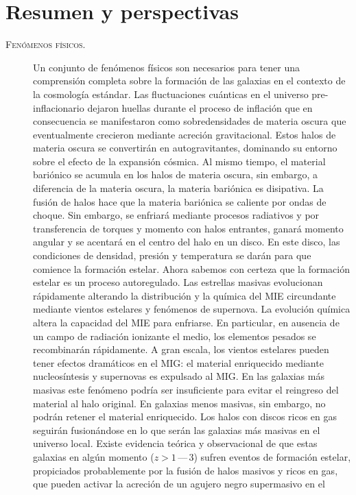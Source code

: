 \documentclass{article}
\begin{document}
\section{Resumen y perspectivas}
%
\begin{description}
%
\item[\textsc{Fenómenos físicos.}] Un conjunto de fenómenos físicos son necesarios para tener una
comprensión completa sobre la formación de las galaxias en el contexto de la cosmología estándar.
Las fluctuaciones cuánticas en el universo pre-inflacionario dejaron huellas durante el proceso de
inflación que en consecuencia se manifestaron como sobredensidades de materia oscura que
eventualmente crecieron mediante acreción gravitacional. Estos halos de materia oscura se
convertirán en autogravitantes, dominando su entorno sobre el efecto de la expansión cósmica. Al
mismo tiempo, el material bariónico se acumula en los halos de materia oscura, sin embargo, a
diferencia de la materia oscura, la materia bariónica es disipativa. La fusión de halos hace que la
materia bariónica se caliente por ondas de choque. Sin embargo, se enfriará mediante procesos
radiativos y por transferencia de torques y momento con halos entrantes, ganará momento angular y se
acentará en el centro del halo en un disco. En este disco, las condiciones de densidad, presión y
temperatura se darán para que comience la formación estelar. Ahora sabemos con certeza que la
formación estelar es un proceso autoregulado. Las estrellas masivas evolucionan rápidamente
alterando la distribución y la química del MIE circundante mediante vientos estelares y fenómenos de
supernova. La evolución química altera la capacidad del MIE para enfriarse. En particular, en
ausencia de un campo de radiación ionizante el medio, los elementos pesados se recombinarán
rápidamente. A gran escala, los vientos estelares pueden tener efectos dramáticos en el MIG: el
material enriquecido mediante nucleosíntesis y supernovas es expulsado al MIG. En las galaxias más
masivas este fenómeno podría ser insuficiente para evitar el reingreso del material al halo
original. En galaxias menos masivas, sin embargo, no podrán retener el material enriquecido. Los
halos con discos ricos en gas seguirán fusionándose en lo que serán las galaxias más masivas en el
universo local. Existe evidencia teórica y observacional de que estas galaxias en algún momento
($z>1\,$---$\,3$) sufren eventos de formación estelar, propiciados probablemente por la fusión de
halos masivos y ricos en gas, que pueden activar la acreción de un agujero negro supermasivo en el

\end{description}
\end{document}
